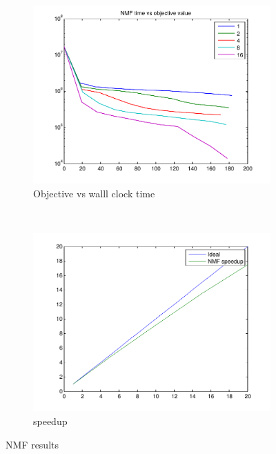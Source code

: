 \begin{figure}[!h]
        \centering
       \begin{subfigure}[b]{0.4\textwidth}
                \includegraphics[width=\textwidth]{./figs/NMF_plot}
                \caption{Objective vs walll clock time}
        \end{subfigure}
        ~~
        \begin{subfigure}[b]{0.4\textwidth}
                \includegraphics[width=\textwidth]{./figs/speedup}
                \caption{speedup}
        \end{subfigure} 
        \caption{NMF results}\label{fig:NMF_speedup}
\end{figure}


